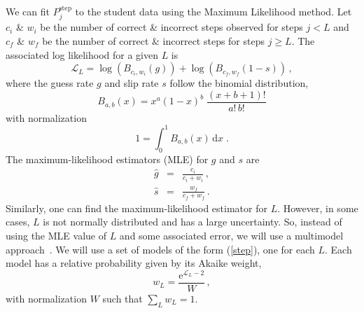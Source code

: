 \documentclass[11pt,letterpaper]{article}
\begin{document}
%
We can fit $P_j^\mathrm{step} $ to the student data using the
Maximum Likelihood method.
Let $c_i$ \& $w_i$ be the number of correct \& incorrect steps observed
for steps $j<L$ and $c_f$ \& $w_f$ be the number of correct \& incorrect
steps for steps $j\ge L$.  The associated log likelihood for a given $L$ is
%
\begin{equation}
  \mathcal{L}_L  =  \log\left(B_{c_i,w_i}(g)\right) 
                  + \log\left(B_{c_f,w_f}(1-s) \right)  \, ,
		  \label{logLike}
\end{equation}
%
where the guess rate $g$ and slip rate $s$ follow the binomial distribution,
%
\begin{equation}
       B_{a,b}(x) = x^a (1-x)^b\; \frac{(x+b+1)!}{a!\, b!} 
\end{equation}
%
with normalization
%
\begin{equation}
      1=\int_0^1 B_{a,b}(x) \,\mathrm{d}x \; .
\end{equation} 
%
The maximum-likelihood estimators (MLE) for $g$ and $s$ are
%
\begin{eqnarray}
  \hat{g} &=&  \frac{c_i}{c_i+w_i} \, ,\\
  \hat{s} &=&  \frac{w_f}{c_f+w_f} \,  .
\end{eqnarray}
%
Similarly, one can find the maximum-likelihood estimator
for $L$.  However, in some cases, $L$ is not normally
distributed and has a large uncertainty.
So, instead of using the MLE value of $L$ and some
associated error, we will use a multimodel approach~\cite{aic-book}.
We will use a set of models of the form (\ref{step}), 
one for each $L$. Each model has a relative probability given 
by its Akaike weight,  
%
\begin{equation}
                   w_L = \frac{\mathrm{e}^{\mathcal{L}_L-2}}{W}\, ,
\end{equation}
%
with normalization $W$ such that $\sum_L w_L=1$.

%
%
%
\end{document}
